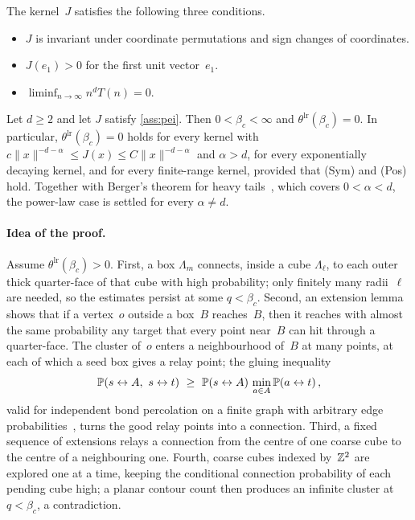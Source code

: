 \documentclass[11pt,letterpaper]{article}
\begin{document}
\begin{assumption}
\label{ass:pei}
The kernel~$J$ satisfies the following three conditions.
\begin{itemize}
  \item[(Sym)] $J$ is invariant under coordinate permutations and sign changes of coordinates.
  \item[(Pos)] $J(e_1)>0$ for the first unit vector~$e_1$.
  \item[(Tail)] $\liminf_{n\to\infty}n^dT(n)=0$.
\end{itemize}
\end{assumption}

\begin{theorem}
\label{thm:pei}
Let $d\ge2$ and let $J$ satisfy \cref{ass:pei}. Then $0<\beta_c<\infty$ and $\theta^{\mathrm{lr}}(\beta_c)=0$. In particular, $\theta^{\mathrm{lr}}(\beta_c)=0$ holds for every kernel with $c\lVert x\rVert^{-d-\alpha}\le J(x)\le C\lVert x\rVert^{-d-\alpha}$ and $\alpha>d$, for every exponentially decaying kernel, and for every finite-range kernel, provided that (Sym) and (Pos) hold. Together with Berger's theorem for heavy tails~\cite[Theorem~2.6]{Ber02}, which covers $0<\alpha<d$, the power-law case is settled for every $\alpha\ne d$.
\end{theorem}

\paragraph{Idea of the proof.} Assume $\theta^{\mathrm{lr}}(\beta_c)>0$. First, a box $\Lambda_m$ connects, inside a cube $\Lambda_\ell$, to each outer thick quarter-face of that cube with high probability; only finitely many radii~$\ell$ are needed, so the estimates persist at some $q<\beta_c$. Second, an extension lemma shows that if a vertex~$o$ outside a box~$B$ reaches~$B$, then it reaches with almost the same probability any target that every point near~$B$ can hit through a quarter-face. The cluster of~$o$ enters a neighbourhood of~$B$ at many points, at each of which a seed box gives a relay point; the gluing inequality
\begin{equation}
\label{eq:gluing}
  \P(s\leftrightarrow A,\ s\leftrightarrow t)\ \ge\ \P(s\leftrightarrow A)\,\min_{a\in A}\P(a\leftrightarrow t)\,,
\end{equation}
valid for independent bond percolation on a finite graph with arbitrary edge probabilities~\cite[Proposition~2.1]{OAI26a}, turns the good relay points into a connection. Third, a fixed sequence of extensions relays a connection from the centre of one coarse cube to the centre of a neighbouring one. Fourth, coarse cubes indexed by~$\Z^2$ are explored one at a time, keeping the conditional connection probability of each pending cube high; a planar contour count then produces an infinite cluster at $q<\beta_c$, a contradiction.
\end{document}
